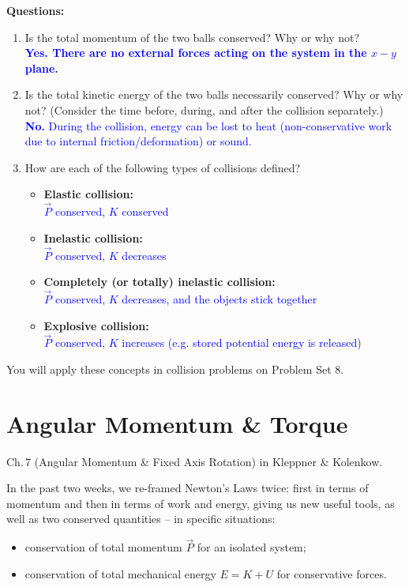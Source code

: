 \documentclass[11pt, letterpaper, openany]{book}
\begin{document}
\textbf{Questions:}
\begin{enumerate}[label=(\roman*)]
    \item Is the total momentum of the two balls conserved? Why or why not? \\
    \textcolor{blue}{\textbf{Yes. There are no external forces acting on the system in the $x-y$ plane.}}
    
    \item Is the total kinetic energy of the two balls necessarily conserved? Why or why not? (Consider the time before, during, and after the collision separately.) \\
    \textcolor{blue}{\textbf{No.} During the collision, energy can be lost to heat (non-conservative work due to internal friction/deformation) or sound.}
    
    \item How are each of the following types of collisions defined?
    \begin{itemize}
        \item \textbf{Elastic collision:} \\
        \textcolor{blue}{$\vec{P}$ conserved, $K$ conserved}
        \item \textbf{Inelastic collision:} \\
        \textcolor{blue}{$\vec{P}$ conserved, $K$ decreases}
        \item \textbf{Completely (or totally) inelastic collision:} \\
        \textcolor{blue}{$\vec{P}$ conserved, $K$ decreases, and the objects stick together}
        \item \textbf{Explosive collision:} \\
        \textcolor{blue}{$\vec{P}$ conserved, $K$ increases (e.g. stored potential energy is released)}
    \end{itemize}
\end{enumerate}

You will apply these concepts in collision problems on Problem Set 8.

\chapter{Angular Momentum \& Torque}

Ch.\,7 (Angular Momentum \& Fixed Axis Rotation) in Kleppner \& Kolenkow.

In the past two weeks, we re-framed Newton's Laws twice: first in terms of momentum and then in terms of work and energy, giving us new useful tools, as well as two conserved quantities -- in specific situations:
\begin{itemize}
    \item conservation of total momentum $\vec{P}$ for an isolated system;
    \item conservation of total mechanical energy $E = K + U$ for conservative forces.
\end{itemize}
\end{document}
